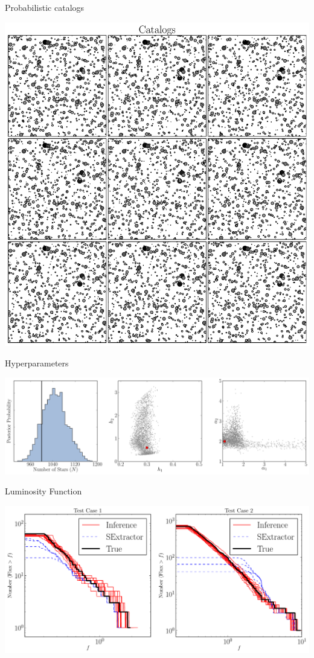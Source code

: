 \begin{frame}[t]{Probabilistic catalogs}
\begin{center}
\includegraphics[scale=0.25]{StarFieldFigures/catalogs.pdf}
\end{center}
\end{frame}

\begin{frame}[t]{Hyperparameters}
\begin{center}
\includegraphics[scale=0.28]{StarFieldFigures/inference2.pdf}
\end{center}
\end{frame}

\begin{frame}[t]{Luminosity Function}
\begin{center}
\includegraphics[scale=0.35]{StarFieldFigures/luminosity_function.pdf}
\end{center}
\end{frame}

